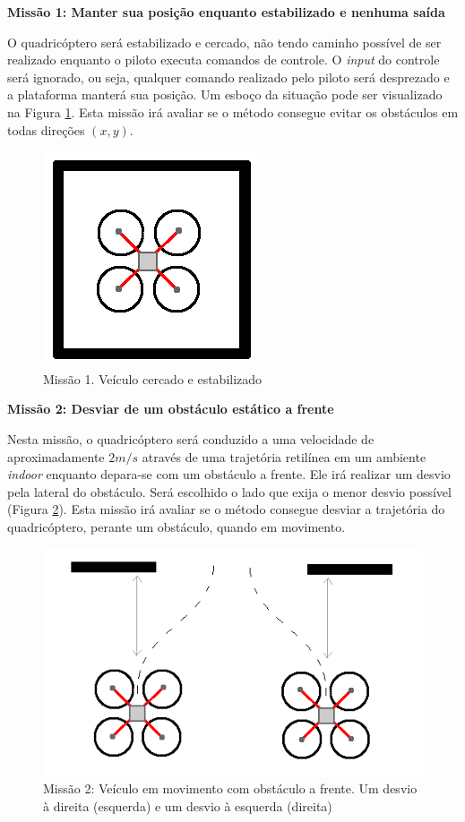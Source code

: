 \documentclass[a4paper, 12pt]{article}
\begin{document}
 \noindent\textbf{Missão 1: Manter sua posição enquanto estabilizado e nenhuma saída}
 
 O quadricóptero será estabilizado e cercado, não tendo caminho possível de ser realizado enquanto o piloto executa comandos de controle. O \textit{input} do controle será ignorado, ou seja, qualquer comando realizado pelo piloto será desprezado e a plataforma manterá sua posição. Um esboço da situação pode ser visualizado na Figura \ref{fig:missao1}. Esta missão irá avaliar se o método consegue evitar os obstáculos em todas direções $(x,y)$.
 
 \begin{figure}[h]
 	\centering
 	\includegraphics[scale=0.5]{img/missao1.png}
 	\caption{Missão 1. Veículo cercado e estabilizado}
 	\label{fig:missao1}
 \end{figure}  
 
 \noindent\textbf{Missão 2: Desviar de um obstáculo estático a frente}
 
 Nesta missão, o quadricóptero será conduzido a uma velocidade de aproximadamente \underline{$2m/s$} através de uma trajetória retilínea em um ambiente \textit{indoor} enquanto depara-se com um obstáculo a frente. Ele irá realizar um desvio pela lateral do obstáculo. Será escolhido o lado que exija o menor desvio possível (Figura \ref{fig:missao2}). Esta missão irá avaliar se o método consegue desviar a trajetória do quadricóptero, perante um obstáculo, quando em movimento.

\begin{figure}[h]
	\centering
	\includegraphics[scale=0.5]{img/missao2.png}
	\caption{Missão 2: Veículo em movimento com obstáculo a frente. Um desvio à direita (esquerda) e um desvio à esquerda (direita)}
	\label{fig:missao2}
\end{figure}  
 
\end{document}
